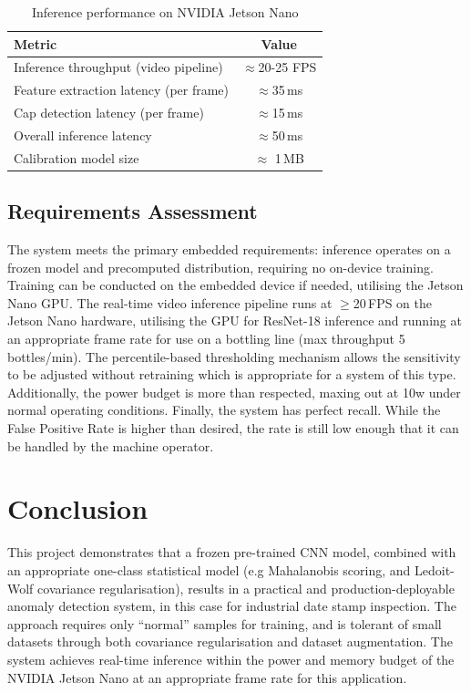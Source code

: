 \documentclass[conference]{IEEEtran}
\begin{document}
\begin{table}[h]
\centering
\caption{Inference performance on NVIDIA Jetson Nano}
\label{tab:embedded}
\renewcommand{\arraystretch}{1.5}
\small
\begin{tabular}{lc}
\hline
\textbf{Metric} & \textbf{Value} \\
\hline
Inference throughput (video pipeline)  & $\approx$20-25 FPS   \\
Feature extraction latency (per frame) & $\approx$35\,ms      \\
Cap detection latency (per frame)      & $\approx$15\,ms      \\
Overall inference latency              & $\approx$50\,ms      \\
Calibration model size                 & $\approx$ 1\,MB       \\
\hline
\end{tabular}
\end{table}

\subsection{Requirements Assessment}

The system meets the primary embedded requirements: inference operates on a frozen model and precomputed distribution, requiring no on-device training. Training can be conducted on the embedded device if needed, utilising the Jetson Nano GPU. The real-time video inference pipeline runs at $\geq$20\,FPS on the Jetson Nano hardware, utilising the GPU for ResNet-18 inference and running at an appropriate frame rate for use on a bottling line (max throughput 5 bottles/min). The percentile-based thresholding mechanism allows the sensitivity to be adjusted without retraining which is appropriate for a system of this type. Additionally, the power budget is more than respected, maxing out at 10w under normal operating conditions. Finally, the system has perfect recall. While the False Positive Rate is higher than desired, the rate is still low enough that it can be handled by the machine operator.

\section{Conclusion}
This project demonstrates that a frozen pre-trained CNN model, combined with an appropriate one-class statistical model (e.g Mahalanobis scoring, and Ledoit-Wolf covariance regularisation), results in a practical and production-deployable anomaly detection system, in this case for industrial date stamp inspection. The approach requires only ``normal'' samples for training, and is tolerant of small datasets through both covariance regularisation and dataset augmentation. The system achieves real-time inference within the power
and memory budget of the NVIDIA Jetson Nano at an appropriate frame rate for this application.
\end{document}
